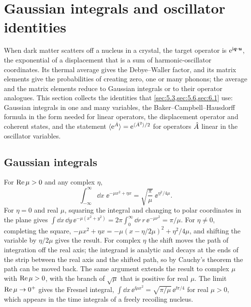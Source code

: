 \section{Gaussian integrals and oscillator identities}\label{app:C.6}

When dark matter scatters off a nucleus in a crystal, the target operator is $\mathrm{e}^{\mathrm{i}\bm{q}\cdot\bm{u}}$, the exponential of a displacement that is a sum of harmonic-oscillator coordinates. Its thermal average gives the Debye--Waller factor, and its matrix elements give the probabilities of creating zero, one or many phonons; the average and the matrix elements reduce to Gaussian integrals or to their operator analogues. This section collects the identities that \cref{sec:5.3,sec:5.6,sec:6.1} use: Gaussian integrals in one and many variables, the Baker--Campbell--Hausdorff formula in the form needed for linear operators, the displacement operator and coherent states, and the statement $\langle\mathrm{e}^{\hat{A}}\rangle = \mathrm{e}^{\langle \hat{A}^2\rangle/2}$ for operators $\hat{A}$ linear in the oscillator variables.

\subsection{Gaussian integrals}

For $\operatorname{Re}\mu > 0$ and any complex $\eta$,
\begin{equation}
  \int_{-\infty}^{\infty}\dd x\;\ee^{-\mu x^2 + \eta x} = \sqrt{\frac{\pi}{\mu}}\;\ee^{\eta^2/4\mu} .
  \label{eq:C.6-gauss}
\end{equation}
For $\eta = 0$ and real $\mu$, squaring the integral and changing to polar coordinates in the plane gives $\int\dd x\,\dd y\,\ee^{-\mu(x^2 + y^2)} = 2\pi\int_0^\infty\dd r\,r\,\ee^{-\mu r^2} = \pi/\mu$. For $\eta \neq 0$, completing the square, $-\mu x^2 + \eta x = -\mu(x - \eta/2\mu)^2 + \eta^2/4\mu$, and shifting the variable by $\eta/2\mu$ gives the result. For complex $\eta$ the shift moves the path of integration off the real axis; the integrand is analytic and decays at the ends of the strip between the real axis and the shifted path, so by Cauchy's theorem the path can be moved back. The same argument extends the result to complex $\mu$ with $\operatorname{Re}\mu > 0$, with the branch of $\sqrt{\mu}$ that is positive for real $\mu$. The limit $\operatorname{Re}\mu \to 0^+$ gives the Fresnel integral, $\int\dd x\,\ee^{\ii\mu x^2} = \sqrt{\pi/\mu}\,\ee^{\ii\pi/4}$ for real $\mu > 0$, which appears in the time integrals of a freely recoiling nucleus.

